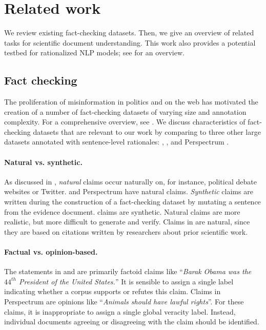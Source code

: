 \section{Related work}

We review existing fact-checking datasets. Then, we give an overview of related tasks for scientific document understanding. This work also provides a potential testbed for rationalized NLP models; see \citet{DeYoung2019ERASERAB} for an overview.


\subsection{Fact checking} \label{sec:fact_checking}

 The proliferation of misinformation in politics and on the web has motivated the creation of a number of fact-checking datasets of varying size and annotation complexity. For a comprehensive overview, see \citet{Hanselowski2019ARA}. We discuss characteristics of fact-checking datasets that are relevant to our work by comparing \ours to three other large datasets annotated with sentence-level rationales: \fever \cite{Thorne2018FEVERAL}, \snopes \cite{Hanselowski2019ARA}, and Perspectrum \cite{Chen2019SeeingTF}.

\paragraph{Natural vs. synthetic.} As discussed in \citet{Hanselowski2019ARA}, \emph{natural} claims occur naturally on, for instance, political debate websites or Twitter. \snopes and Perspectrum have natural claims. \emph{Synthetic} claims are written during the construction of a fact-checking dataset by mutating a sentence from the evidence document. \fever claims are synthetic. Natural claims are more realistic, but more difficult to generate and verify. Claims in \ours are natural, since they are based on citations written by researchers about prior scientific work.

\paragraph{Factual vs. opinion-based.} The statements in \fever and \snopes are primarily factoid claims like ``\emph{Barak Obama was the $44^{th}$ President of the United States.}'' It is sensible to assign a single label indicating whether a corpus supports or refutes this claim. Claims in Perspectrum are opinions like ``\emph{Animals should have lawful rights}''. For these claims, it is inappropriate to assign a single global veracity label. Instead, individual documents agreeing or disagreeing with the claim should be identified.

